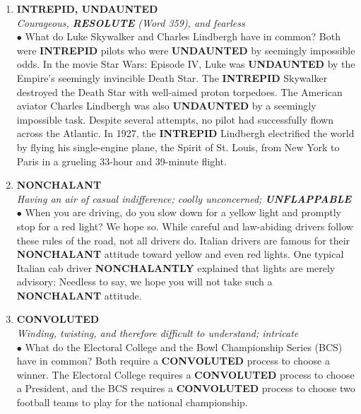 \documentclass{book}
\begin{document}
\begin{enumerate}
\item \textbf{INTREPID, UNDAUNTED}\\
\textit{ Courageous, \textbf{RESOLUTE} (Word 359), and fearless}\\

$\bullet$ What do Luke Skywalker and Charles Lindbergh have in common? Both were \textbf{INTREPID} pilots who were \textbf{UNDAUNTED} by seemingly impossible odds. In the movie Star Wars: Episode IV, Luke was \textbf{UNDAUNTED} by the Empire's seemingly invincible Death Star. The \textbf{INTREPID} Skywalker destroyed the Death Star with well-aimed proton torpedoes. The American aviator Charles Lindbergh was also \textbf{UNDAUNTED} by a seemingly impossible task. Despite several attempts, no pilot had successfully flown across the Atlantic. In 1927, the \textbf{INTREPID} Lindbergh electrified the world by flying his single-engine plane, the Spirit of St. Louis, from New York to Paris in a grueling 33-hour and 39-minute flight. 

\item \textbf{NONCHALANT}\\
\textit{ Having an air of casual indifference; coolly unconcerned; \textbf{UNFLAPPABLE}}\\

$\bullet$ When you are driving, do you slow down for a yellow light and promptly stop for a red light? We hope so. While careful and law-abiding drivers follow these rules of the road, not all drivers do. Italian drivers are famous for their \textbf{NONCHALANT} attitude toward yellow and even red lights. One typical Italian cab driver \textbf{NONCHALANTLY} explained that lights are merely advisory:  Needless to say, we hope you will  not take such a \textbf{NONCHALANT} attitude.

\item \textbf{CONVOLUTED}\\
\textit{ Winding, twisting, and therefore difficult to understand; intricate}\\

$\bullet$  What do the Electoral College and the Bowl Championship Series (BCS) have in common? Both require a \textbf{CONVOLUTED} process to choose a winner. The Electoral College requires a \textbf{CONVOLUTED} process to choose a President, and the BCS requires a \textbf{CONVOLUTED} process to choose two football teams to play for the national championship. 


\end{enumerate}
\end{document}

